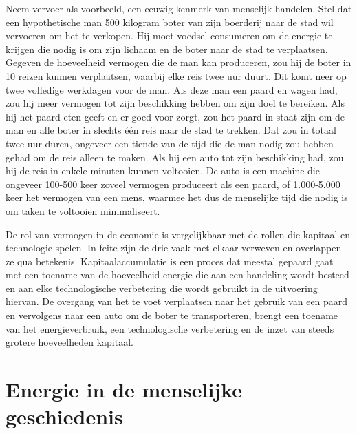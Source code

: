 Neem vervoer als voorbeeld, een eeuwig kenmerk van menselijk handelen. Stel dat een hypothetische man 500 kilogram boter van zijn boerderij naar de stad wil vervoeren om het te verkopen. Hij moet voedsel consumeren om de energie te krijgen die nodig is om zijn lichaam en de boter naar de stad te verplaatsen. Gegeven de hoeveelheid vermogen die de man kan produceren, zou hij de boter in 10 reizen kunnen verplaatsen, waarbij elke reis twee uur duurt. Dit komt neer op twee volledige werkdagen voor de man. Als deze man een paard en wagen had, zou hij meer vermogen tot zijn beschikking hebben om zijn doel te bereiken. Als hij het paard eten geeft en er goed voor zorgt, zou het paard in staat zijn om de man en alle boter in slechts één reis naar de stad te trekken. Dat zou in totaal twee uur duren, ongeveer een tiende van de tijd die de man nodig zou hebben gehad om de reis alleen te maken. Als hij een auto tot zijn beschikking had, zou hij de reis in enkele minuten kunnen voltooien. De auto is een machine die ongeveer 100-500 keer zoveel vermogen produceert als een paard, of 1.000-5.000 keer het vermogen van een mens, waarmee het dus de menselijke tijd die nodig is om taken te voltooien minimaliseert.

De rol van vermogen in de economie is vergelijkbaar met de rollen die kapitaal en technologie spelen. In feite zijn de drie vaak met elkaar verweven en overlappen ze qua betekenis. Kapitaalaccumulatie is een proces dat meestal gepaard gaat met een toename van de hoeveelheid energie die aan een handeling wordt besteed en aan elke technologische verbetering die wordt gebruikt in de uitvoering hiervan. De overgang van het te voet verplaatsen naar het gebruik van een paard en vervolgens naar een auto om de boter te transporteren, brengt een toename van het energieverbruik, een technologische verbetering en de inzet van steeds grotere hoeveelheden kapitaal.

\vspace{-0.5em}
\hypertarget{energie-in-de-menselijke-geschiedenis}{%
\section{Energie in de menselijke geschiedenis}\label{energie-in-de-menselijke-geschiedenis}}

